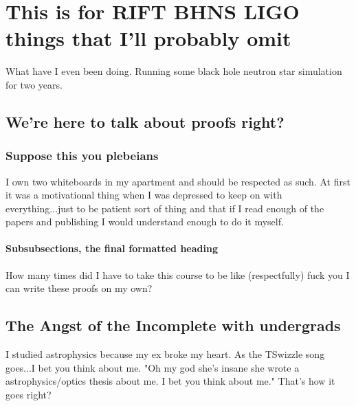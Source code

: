 \chapter{This is for RIFT BHNS LIGO things that I'll probably omit}

What have I even been doing. Running some black hole neutron star simulation for two years. 

\section[Shorter Title]{We're here to talk about proofs right?}



\subsection{Suppose this you plebeians}

I own two whiteboards in my apartment and should be respected as such. At first it was a motivational thing when I was depressed to keep on with everything...just to be patient sort of thing and that if I read enough of the papers and publishing I would understand enough to do it myself. 

\subsubsection{Subsubsections, the final formatted heading}

How many times did I have to take this course to be like (respectfully) fuck you I can write these proofs on my own?

\section{The Angst of the Incomplete with undergrads}

I studied astrophysics because my ex broke my heart. As the TSwizzle song goes...I bet you think about me. "Oh my god she's insane she wrote a astrophysics/optics thesis about me. I bet you think about me." That's how it goes right?